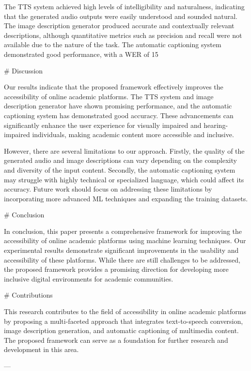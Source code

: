 The TTS system achieved high levels of intelligibility and naturalness, indicating that the generated audio outputs were easily understood and sounded natural. The image description generator produced accurate and contextually relevant descriptions, although quantitative metrics such as precision and recall were not available due to the nature of the task. The automatic captioning system demonstrated good performance, with a WER of 15%

# Discussion

Our results indicate that the proposed framework effectively improves the accessibility of online academic platforms. The TTS system and image description generator have shown promising performance, and the automatic captioning system has demonstrated good accuracy. These advancements can significantly enhance the user experience for visually impaired and hearing-impaired individuals, making academic content more accessible and inclusive.

However, there are several limitations to our approach. Firstly, the quality of the generated audio and image descriptions can vary depending on the complexity and diversity of the input content. Secondly, the automatic captioning system may struggle with highly technical or specialized language, which could affect its accuracy. Future work should focus on addressing these limitations by incorporating more advanced ML techniques and expanding the training datasets.

# Conclusion

In conclusion, this paper presents a comprehensive framework for improving the accessibility of online academic platforms using machine learning techniques. Our experimental results demonstrate significant improvements in the usability and accessibility of these platforms. While there are still challenges to be addressed, the proposed framework provides a promising direction for developing more inclusive digital environments for academic communities.

# Contributions

This research contributes to the field of accessibility in online academic platforms by proposing a multi-faceted approach that integrates text-to-speech conversion, image description generation, and automatic captioning of multimedia content. The proposed framework can serve as a foundation for further research and development in this area.

---

